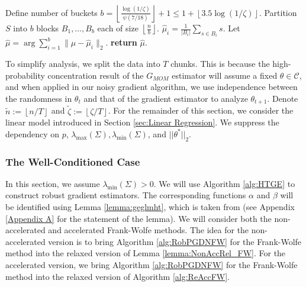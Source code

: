 \documentclass{article}
\begin{document}

\begin{algorithm}
\caption{Heavy-Tailed Gradient Estimator}
\label{alg:HTGE}
\begin{algorithmic}[1]
    \State Define number of buckets $b = \left\lfloor \frac{\log(1/\zeta)}{\psi(7/18)} \right\rfloor + 1 \leq 1 + \left\lfloor 3.5 \log(1/\zeta) \right\rfloor$.
    \State Partition $S$ into $b$ blocks $B_1, \ldots, B_b$ each of size $\left\lfloor \frac{n}{b} \right\rfloor$.
        \State $\widehat{\mu}_i = \frac{1}{|B_i|} \sum_{s \in B_i} s$.
    \EndFor
    \State Let $\widehat{\mu} = \mathop{\arg \min\limits_{\mu}} \sum_{i=1}^{b} \| \mu - \widehat{\mu}_i \|_2$.
    \State \textbf{return} $\widehat{\mu}$.
\EndFunction
\end{algorithmic}
\end{algorithm}


To simplify analysis, we split the data into $T$ chunks. This is because the high-probability concentration result of the $G_{MOM}$ estimator will assume a fixed $\theta \in \mathcal{C}$, and when applied in our noisy gradient algorithm, we use independence between the randomness in $\theta_t$ and that of the gradient estimator to analyze $\theta_{t + 1}$. Denote $\widetilde{n} := \left\lfloor n/T \right\rfloor$ and $\widetilde{\zeta} := \left\lfloor \zeta/T \right\rfloor$.
For the remainder of this section, we consider the linear model introduced in Section \ref{sec:Linear Regression}. We suppress the dependency on $p$, $\lambda_{\max}(\Sigma), \lambda_{\min}(\Sigma)$, and $||\theta^*||_2$.

\subsubsection{The Well-Conditioned Case}\label{sec:Well_Cond_Sec_FW}

In this section, we assume $\lambda_{\min}(\Sigma) > 0$. We will use Algorithm \ref{alg:HTGE} to construct robust gradient estimators. The corresponding functions $\alpha$ and $\beta$ will be identified using Lemma \ref{lemma:geglmht}, which is taken from \cite{RE} (see Appendix \ref{Appendix A} for the statement of the lemma).
We will consider both the non-accelerated and accelerated Frank-Wolfe methods. The idea for the non-accelerated version is to bring Algorithm \ref{alg:RobPGDNFW} for the Frank-Wolfe method into the relaxed version of Lemma \ref{lemma:NonAccRel_FW}. For the accelerated version, we bring Algorithm \ref{alg:RobPGDNFW} for the Frank-Wolfe method into the relaxed version of Algorithm \ref{alg:ReAccFW}.
\end{document}
